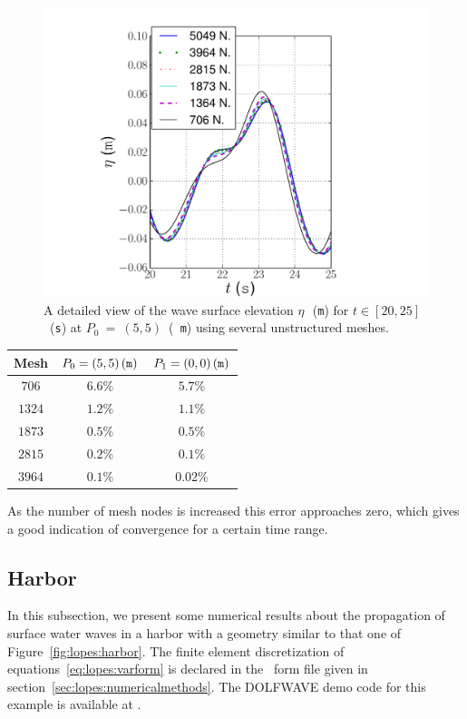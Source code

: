 \begin{figure}
\bwfig
  \centering
    \includegraphics[width=\largefig]{chapters/lopes/pdf/detail_unstr.pdf}
    \caption{A detailed view of the wave surface elevation
      $\eta$\,~({\tt m}) for $t\in[20,25]$~({\tt s}) at $P_0~=~(5,5)$~({\tt
        m}) using several unstructured meshes.}
  \label{fig:lopes:unstdetail}
\end{figure}


%
\begin{center}
  \renewcommand{\arraystretch}{1.3}
  \begin{tabular}{ccc}
    \toprule
     Mesh & $P_0=(5,5)\,({\tt m})$ & $P_1=(0,0)\,({\tt m})$\\
     \midrule
     $706$ &$6.6\%$ & $5.7\%$ \\
     $1324$  &$1.2\%$    &$1.1\%$ \\
     $1873$ & $0.5\%$   & $0.5\%$ \\
     $2815$ & $0.2\%$  &$0.1\%$  \\
     $3964$ & $0.1\%$    &$0.02\%$\\
     \bottomrule
  \end{tabular}
\end{center}
%
As the number of mesh nodes is increased this error approaches zero,
which gives a good indication of convergence for a certain time range.

\subsection{Harbor}

In this subsection, we present some numerical results about the
propagation of surface water waves in a harbor with a geometry similar
to that one of Figure~\ref{fig:lopes:harbor}.  The finite element
discretization of equations~\eqref{eq:lopes:varform} is declared in
the \ufl\ form file given in section~\ref{sec:lopes:numericalmethods}.
The DOLFWAVE demo code for this example is available at
.

